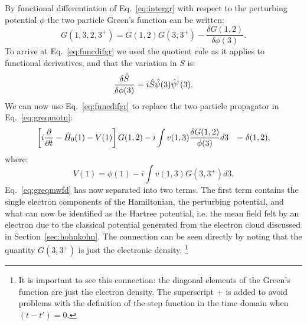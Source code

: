 By functional differentiation of Eq.~\ref{eq:intergr} with respect to the perturbing potential $\phi$ 
the two particle Green's function can be written:
%
\begin{equation}
\label{eq:funcdifgr}
G(1,3,2,3^{+}) = G(1,2)G(3,3^{+}) - \frac{\delta G(1,2)}{\delta \phi(3)}.
\end{equation}
%
To arrive at Eq.~\ref{eq:funcdifgr} we used the quotient rule as it applies to functional derivatives, 
and that the variation in $S$ is:   
%
\begin{equation}
\frac{\delta \hat{S}}{\delta\phi(3)} = i \hat{S} \hat{\psi}(3)\hat{\psi}^{\dagger}(3).
\end{equation}
%
We can now use Eq.~\ref{eq:funcdifgr} to replace the two particle propagator in Eq.~\ref{eq:greqmotn}:
%
\begin{align}
\label{eq:greqmwfd}
\left[i\frac{\partial}{\partial t}-\hat{H}_{0}(1)-V(1)\right]G(1,2) &
	-i\int v(1,3)\frac{\delta G(1,2)}{\phi(3)}d3 &=\delta(1,2),
\end{align}
%
where: 
%
\begin{equation}
V(1) = \phi(1) - i\int v(1,3) G(3,3^{+})d3.
\end{equation}
%
Eq.~\ref{eq:greqmwfd} has now separated into two terms. The first term
contains the single electron components
of the Hamiltonian, the perturbing potential, and what can now be
identified as the Hartree potential, i.e. the mean field
felt by an electron due to the classical potential generated from the electron cloud 
discussed in Section~\ref{sec:hohnkohn}. The connection can be seen directly 
by noting that the quantity $G(3,3^{+})$ is just the electronic density. 
\footnote{It is important to see this connection: the diagonal elements 
of the Green's function are just the electron density. 
The superscript $+$ is added to avoid problems
with the definition of the step function in the time 
domain when $(t-t')=0$.}

